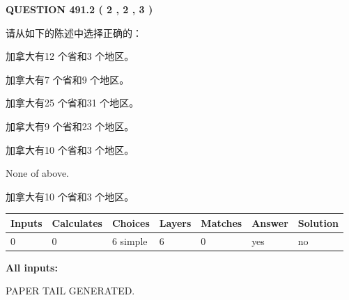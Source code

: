 \documentclass{ctexart}
\begin{document}
   
  
\vspace{0.2in}
  
{\textbf{\Large{QUESTION
491.2 
 ( 2 , 2 , 3 )
}}}
  
  
请从如下的陈述中选择正确的：
 
 
加拿大有12 个省和3 个地区。
 
 
加拿大有7 个省和9 个地区。
 
 
加拿大有25 个省和31 个地区。
 
 
加拿大有9 个省和23 个地区。
 
 
加拿大有10 个省和3 个地区。
 
 
 None of above.
 
 
\noindent{}
 
 
加拿大有10 个省和3 个地区。
 
 
\noindent{}
 
 
   
   
   
   
\noindent\begin{tabular}{|l|l|l|l|l|l|l|}
 \hline
Inputs & Calculates & Choices & Layers & Matches & Answer & Solution \\ \hline
 0  & 
 0  & 
 6
  simple  
  & 
 6  & 
 0  & 
  yes & 
  no 
  \\ \hline
 \end{tabular}
   
   
   
   
\noindent{}
   
   
   
   
\noindent\vspace{0.1in}\hspace{-0.08in} {\textbf{\Large{All inputs: }}}
   
   
   
   
   
   
 \vspace{0.2in}
 
   
   
\vspace{2.0in} PAPER TAIL GENERATED.
   
\end{document}
